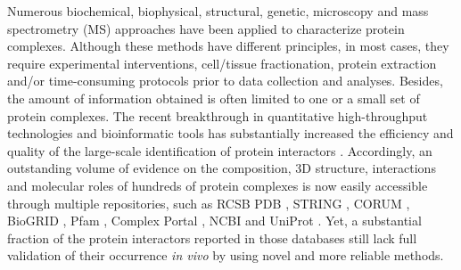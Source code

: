 Numerous biochemical, biophysical, structural, genetic, microscopy and mass spectrometry (MS) approaches have been applied to characterize protein complexes. Although these methods have different principles, in most cases, they require experimental interventions, cell/tissue fractionation, protein extraction and/or time-consuming protocols prior to data collection and analyses. Besides, the amount of information obtained is often limited to one or a small set of protein complexes. The recent breakthrough in quantitative high-throughput technologies and bioinformatic tools has substantially increased the efficiency and quality of the large-scale identification of protein interactors \cite{Iacobucci_2021, Low_2021}. Accordingly, an outstanding volume of evidence on the composition, 3D structure, interactions and molecular roles of hundreds of protein complexes is now easily accessible through multiple repositories, such as RCSB PDB \cite{Burley_2021}, STRING \cite{Szklarczyk_2021}, CORUM \cite{Giurgiu_2019}, BioGRID \cite{Oughtred_2021}, Pfam \cite{Mistry_2021}, Complex Portal \cite{Meldal_2021}, NCBI \cite{Coordinators_2016} and UniProt \cite{UniProt_2021}. Yet, a substantial fraction of the protein interactors reported in those databases still lack full validation of their occurrence \emph{in vivo} by using novel and more reliable methods.\\
